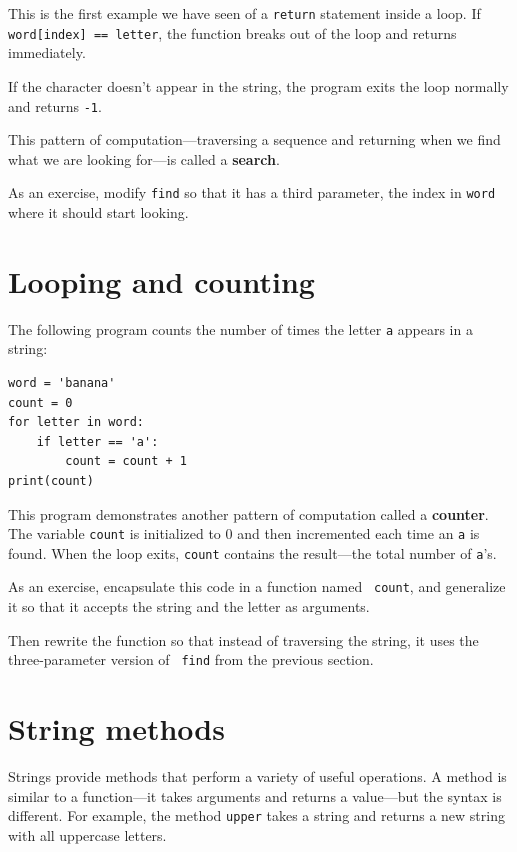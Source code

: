 \documentclass[10pt]{book}
\begin{document}
This is the first example we have seen of a {\tt return} statement
inside a loop.  If {\tt word[index] == letter}, the function breaks
out of the loop and returns immediately.

If the character doesn't appear in the string, the program
exits the loop normally and  returns {\tt -1}.

This pattern of computation---traversing a sequence and returning
when we find what we are looking for---is called a {\bf search}.

As an exercise, modify {\tt find} so that it has a
third parameter, the index in {\tt word} where it should start
looking.


\section{Looping and counting}
\label{counter}

The following program counts the number of times the letter {\tt a}
appears in a string:

\begin{verbatim}
word = 'banana'
count = 0
for letter in word:
    if letter == 'a':
        count = count + 1
print(count)
\end{verbatim}
%
This program demonstrates another pattern of computation called a {\bf
counter}.  The variable {\tt count} is initialized to 0 and then
incremented each time an {\tt a} is found.
When the loop exits, {\tt count}
contains the result---the total number of {\tt a}'s.

As an exercise, encapsulate this code in a function named {\tt
count}, and generalize it so that it accepts the string and the
letter as arguments.

Then rewrite the function so that instead of
traversing the string, it uses the three-parameter version of {\tt
find} from the previous section.


\section{String methods}
\label{optional}

Strings provide methods that perform a variety of useful operations.
A method is similar to a function---it takes arguments and
returns a value---but the syntax is different.  For example, the
method {\tt upper} takes a string and returns a new string with
all uppercase letters.
\end{document}
